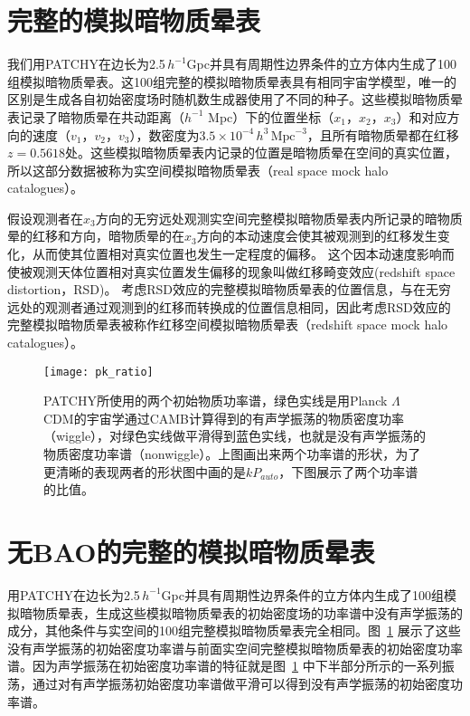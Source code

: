 \section{完整的模拟暗物质晕表}
\label{sec:datacomple}

我们用\textsc{PATCHY}在边长为2.5\,$h^{-1}$Gpc并具有周期性边界条件的立方体内生成了100组模拟暗物质晕表。这100组完整的模拟暗物质晕表具有相同宇宙学模型，唯一的区别是生成各自初始密度场时随机数生成器使用了不同的种子。这些模拟暗物质晕表记录了暗物质晕在共动距离（$h^{-1}$ Mpc）下的位置坐标（$x_1$，$x_2$，$x_3$）和对应方向的速度（$v_1$，$v_2$，$v_3$），数密度为$3.5\times10^{-4}\,h^3\,\mathrm{Mpc}^{-3}$，且所有暗物质晕都在红移$z = 0.5618$处。这些模拟暗物质晕表内记录的位置是暗物质晕在空间的真实位置，所以这部分数据被称为实空间模拟暗物质晕表（real space mock halo catalogues）。

假设观测者在$x_3$方向的无穷远处观测实空间完整模拟暗物质晕表内所记录的暗物质晕的红移和方向，暗物质晕的在$x_3$方向的本动速度会使其被观测到的红移发生变化，从而使其位置相对真实位置也发生一定程度的偏移。
这个因本动速度影响而使被观测天体位置相对真实位置发生偏移的现象叫做红移畸变效应(redshift space distortion，RSD)。
考虑RSD效应的完整模拟暗物质晕表的位置信息，与在无穷远处的观测者通过观测到的红移而转换成的位置信息相同，因此考虑RSD效应的完整模拟暗物质晕表被称作红移空间模拟暗物质晕表（redshift space mock halo catalogues）。

\begin{figure}
\centering
\texttt{[image: pk\_ratio]}
\caption{\textsc{PATCHY}所使用的两个初始物质功率谱，绿色实线是用Planck $\Lambda$CDM的宇宙学通过CAMB计算得到的有声学振荡的物质密度功率（wiggle），对绿色实线做平滑得到蓝色实线，也就是没有声学振荡的物质密度功率谱（nonwiggle）。上图画出来两个功率谱的形状，为了更清晰的表现两者的形状图中画的是$k P_{auto}$，下图展示了两个功率谱的比值。}
\label{fig:pkratio}
\end{figure}

\section{无BAO的完整的模拟暗物质晕表}
\label{sec:datanw}

用\textsc{PATCHY}在边长为2.5\,$h^{-1}$Gpc并具有周期性边界条件的立方体内生成了100组模拟暗物质晕表，生成这些模拟暗物质晕表的初始密度场的功率谱中没有声学振荡的成分，其他条件与实空间的100组完整模拟暗物质晕表完全相同。图~\ref{fig:pkratio} 展示了这些没有声学振荡的初始密度功率谱与前面实空间完整模拟暗物质晕表的初始密度功率谱。因为声学振荡在初始密度功率谱的特征就是图~\ref{fig:pkratio} 中下半部分所示的一系列振荡，通过对有声学振荡初始密度功率谱做平滑可以得到没有声学振荡的初始密度功率谱。

